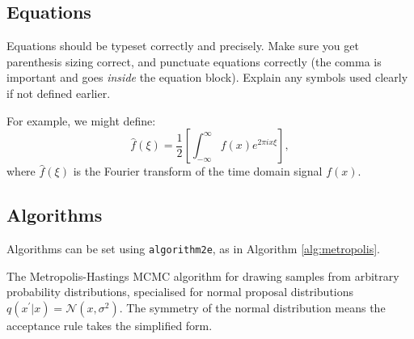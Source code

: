 \documentclass{l4proj}
\begin{document}
\clearpage

\subsection{Equations}

Equations should be typeset correctly and precisely. Make sure you get parenthesis sizing correct, and punctuate equations correctly 
(the comma is important and goes \textit{inside} the equation block). Explain any symbols used clearly if not defined earlier. 

For example, we might define:
\begin{equation}
    \hat{f}(\xi) = \frac{1}{2}\left[ \int_{-\infty}^{\infty} f(x) e^{2\pi i x \xi} \right],
\end{equation}    
where $\hat{f}(\xi)$ is the Fourier transform of the time domain signal $f(x)$.

\subsection{Algorithms}
Algorithms can be set using \texttt{algorithm2e}, as in Algorithm \ref{alg:metropolis}.

\begin{algorithm}
    \DontPrintSemicolon
    
\caption{The Metropolis-Hastings MCMC algorithm for drawing samples from arbitrary probability distributions, 
specialised for normal proposal distributions $q(x^\prime|x) = \mathcal{N}(x, \sigma^2)$. The symmetry of the normal distribution means the acceptance rule takes the simplified form.}\label{alg:metropolis}
\end{algorithm}
\end{document}
